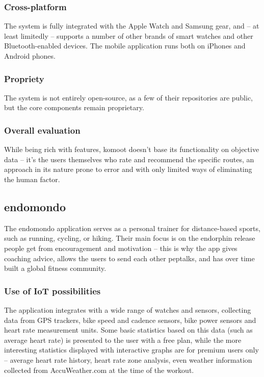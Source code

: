 \subsubsection*{Cross-platform}
The system is fully integrated with the Apple Watch and Samsung gear, and -- at least limitedly -- supports a number of other brands of smart watches and other Bluetooth-enabled devices.
The mobile application runs both on iPhones and Android phones.
\subsubsection*{Propriety}
The system is not entirely open-source, as a few of their repositories are public, but the core components remain proprietary. 

\subsubsection*{Overall evaluation}
While being rich with features, komoot doesn't base its functionality on objective data -- it's the users themselves who rate and recommend the specific routes,
an approach in its nature prone to error and with only limited ways of eliminating the human factor.
\subsection{endomondo}

The endomondo application serves as a personal trainer for distance-based sports, such as running, cycling, or hiking.
Their main focus is on the endorphin release people get from encouragement and motivation -- this is why the app gives coaching advice, allows the users to send each other peptalks, and has over time built a global fitness community.
\subsubsection*{Use of IoT possibilities}
The application integrates with a wide range of watches and sensors, collecting data from GPS trackers, bike speed and cadence sensors, bike power sensors and heart rate measurement units.
Some basic statistics based on this data (such as average heart rate) is presented to the user with a free plan, 
while the more interesting statistics displayed with interactive graphs are for premium users only -- average heart rate history, heart rate zone analysis, even weather information collected from AccuWeather.com at the time of the workout.

